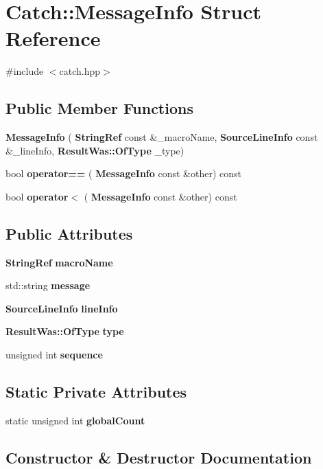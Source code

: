 \section{Catch\+::Message\+Info Struct Reference}
\label{struct_catch_1_1_message_info}


{\ttfamily \#include $<$catch.\+hpp$>$}

\subsection*{Public Member Functions}
\begin{DoxyCompactItemize}
\item 
\textbf{ Message\+Info} (\textbf{ String\+Ref} const \&\+\_\+macro\+Name, \textbf{ Source\+Line\+Info} const \&\+\_\+line\+Info, \textbf{ Result\+Was\+::\+Of\+Type} \+\_\+type)
\item 
bool \textbf{ operator==} (\textbf{ Message\+Info} const \&other) const
\item 
bool \textbf{ operator$<$} (\textbf{ Message\+Info} const \&other) const
\end{DoxyCompactItemize}
\subsection*{Public Attributes}
\begin{DoxyCompactItemize}
\item 
\textbf{ String\+Ref} \textbf{ macro\+Name}
\item 
std\+::string \textbf{ message}
\item 
\textbf{ Source\+Line\+Info} \textbf{ line\+Info}
\item 
\textbf{ Result\+Was\+::\+Of\+Type} \textbf{ type}
\item 
unsigned int \textbf{ sequence}
\end{DoxyCompactItemize}
\subsection*{Static Private Attributes}
\begin{DoxyCompactItemize}
\item 
static unsigned int \textbf{ global\+Count}
\end{DoxyCompactItemize}


\subsection{Constructor \& Destructor Documentation}
\mbox{\label{struct_catch_1_1_message_info_afac7a84a9e8655428035a3c5418044f0}} 
